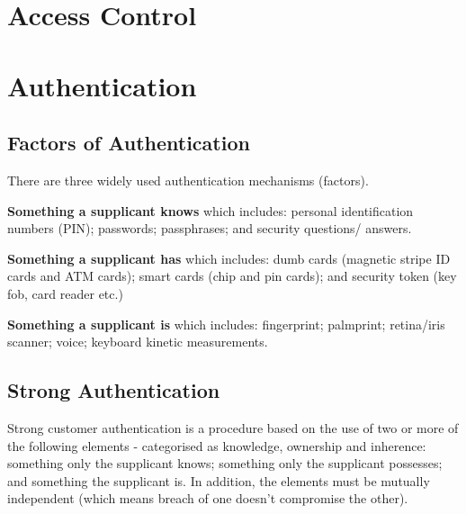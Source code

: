 \section*{Access Control}


\section*{Authentication}
\subsection*{Factors of Authentication}
There are three widely used authentication mechanisms (factors).

\textbf{Something a supplicant knows} which includes: personal identification numbers (PIN); passwords; passphrases; and security questions/ answers.

\textbf{Something a supplicant has} which includes: dumb cards (magnetic stripe ID cards and ATM cards); smart cards (chip and pin cards); and security token (key fob, card reader etc.)

\textbf{Something a supplicant is} which includes: fingerprint; palmprint; retina/iris scanner; voice; keyboard kinetic measurements.

\subsection*{Strong Authentication}
Strong customer authentication is a procedure based on the use of two or more of the following elements - categorised as knowledge, ownership and inherence: something only the supplicant knows; something only the supplicant possesses; and something the supplicant is. In addition, the elements must be mutually independent (which means breach of one doesn't compromise the other).
